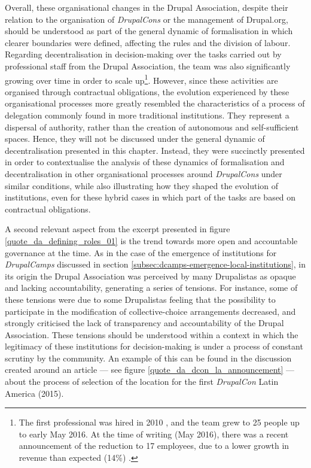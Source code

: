 Overall, these organisational changes in the Drupal Association, despite their relation to the organisation of \textit{DrupalCons} or the management of Drupal.org,  should be understood as part of the general dynamic of formalisation in which clearer boundaries were defined, affecting the rules and the division of labour. Regarding decentralisation in decision-making over the tasks carried out by professional staff from the Drupal Association, the team was also significantly growing over time in order to scale up\footnote{The first professional was hired in 2010 \parencite{da-first-staff:2016:Online}, and the team grew to 25 people up to early May 2016. At the time of writing (May 2016), there was a recent announcement of the reduction to 17 employees, due to a lower growth in revenue than expected (14\%) \parencite{da-cuts:2016:Online}.}. However, since these activities are organised through contractual obligations, the evolution experienced by these organisational processes more greatly resembled the characteristics of a process of delegation commonly found in more traditional institutions. They represent a dispersal of authority, rather than the creation of autonomous and self-sufficient spaces. Hence, they will not be discussed under the general dynamic of decentralisation presented in this chapter. Instead, they were succinctly presented in order to contextualise the analysis of these dynamics of formalisation and decentralisation in other organisational processes around \textit{DrupalCons} under similar conditions, while also illustrating how they shaped the evolution of institutions, even for these hybrid cases in which part of the tasks are based on contractual obligations.

A second relevant aspect from the excerpt presented in figure \ref{quote_da_defining_roles_01} is the trend towards more open and accountable governance at the time. As in the case of the emergence of institutions for \textit{DrupalCamps} discussed in section \ref{subsec:dcamps-emergence-local-institutions}, in its origin the Drupal Association was perceived by many Drupalistas as opaque and lacking accountability, generating a series of tensions. For instance, some of these tensions were due to some Drupalistas feeling that the possibility to participate in the modification of collective-choice arrangements decreased, and strongly criticised the lack of transparency and accountability of the Drupal Association. These tensions should be understood within a context in which the legitimacy of these institutions for decision-making is under a process of constant scrutiny by the community. An example of this can be found in the discussion created around an article --- see figure \ref{quote_da_dcon_la_announcement} ---  about the process of selection of the location for the first \textit{DrupalCon} Latin America (2015).

